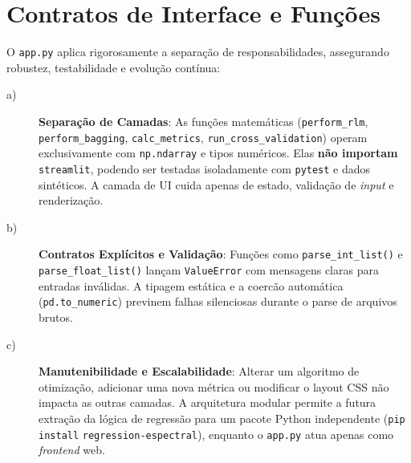 \section{Contratos de Interface e Funções}
O \verb|app.py| aplica rigorosamente a separação de responsabilidades, assegurando robustez, testabilidade e evolução contínua:
\begin{description}
\item[a)] \textbf{Separação de Camadas}: As funções matemáticas (\verb|perform_rlm|, \verb|perform_bagging|, \verb|calc_metrics|, \verb|run_cross_validation|) operam exclusivamente com \verb|np.ndarray| e tipos numéricos. Elas \textbf{não importam} \verb|streamlit|, podendo ser testadas isoladamente com \texttt{pytest} e dados sintéticos. A camada de UI cuida apenas de estado, validação de \textit{input} e renderização.
\item[b)] \textbf{Contratos Explícitos e Validação}: Funções como \verb|parse_int_list()| e \verb|parse_float_list()| lançam \verb|ValueError| com mensagens claras para entradas inválidas. A tipagem estática e a coercão automática (\verb|pd.to_numeric|) previnem falhas silenciosas durante o parse de arquivos brutos.
\item[c)] \textbf{Manutenibilidade e Escalabilidade}: Alterar um algoritmo de otimização, adicionar uma nova métrica ou modificar o layout CSS não impacta as outras camadas. A arquitetura modular permite a futura extração da lógica de regressão para um pacote Python independente (\verb|pip| \verb|install| \verb|regression-espectral|), enquanto o \verb|app.py| atua apenas como \textit{frontend} web.
\end{description}